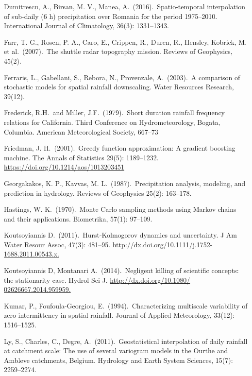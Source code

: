 \documentclass{svjour3}
\renewcommand\hl[1]{#1}
\begin{document}
\begin{thebibliography}{9}
Dumitrescu, A., Birsan, M. V., Manea, A.\ (2016).\ Spatio-temporal interpolation of sub-daily (6 h) precipitation over Romania for the period 1975--2010.
International Journal of Climatology, 36(3): 1331--1343.

Farr, T. G., Rosen, P. A., Caro, E., Crippen, R., Duren, R., Hensley,  Kobrick, M. et al.\ (2007).\ The shuttle radar topography mission.
Reviews of Geophysics, 45(2).

Ferraris, L., Gabellani, S., Rebora, N.,  Provenzale, A.\ (2003).\
A comparison of stochastic models for spatial rainfall downscaling.
Water Resources Research, 39(12).

Frederick, R.H.\ and Miller, J.F.\ (1979).\ Short duration rainfall frequency relations for California.
Third Conference on Hydrometeorology, Bogata, Columbia.
American Meteorological Society, 667--73

\hl{Friedman}, J. H.\ (2001).\ Greedy function approximation: A gradient boosting machine.
The Annals of Statistics 29(5): 1189--1232. \url{https://doi.org/10.1214/aos/1013203451}

Georgakakos, K. P., Kavvas, M. L.\ (1987).\ Precipitation analysis, modeling, and prediction in hydrology.
Reviews of Geophysics 25(2): 163--178.

Hastings, W. K.\ (1970).\ Monte Carlo sampling methods using Markov chains and their applications.
Biometrika, 57(1): 97--109.

Koutsoyiannis D.\ (2011).\ Hurst-Kolmogorov dynamics and uncertainty.
J Am Water Resour Assoc, 47(3): 481--95.
\url{http://dx.doi.org/10.1111/j.1752- 1688.2011.00543.x.}

Koutsoyiannis D, Montanari A.\ (2014).\ Negligent killing of scientific concepts: the stationarity case.
Hydrol Sci J. \url{http://dx.doi.org/10.1080/ 02626667.2014.959959.}

Kumar, P., Foufoula-Georgiou, E.\ (1994).\ Characterizing multiscale variability of zero intermittency in spatial rainfall.
Journal of Applied Meteorology, 33(12): 1516--1525.

Ly, S., Charles, C., Degre, A.\ (2011).\ Geostatistical interpolation of daily rainfall at catchment scale:
The use of several variogram models in the Ourthe and Ambleve catchments, Belgium.
Hydrology and Earth System Sciences, 15(7): 2259--2274.


\end{thebibliography}
\end{document}
